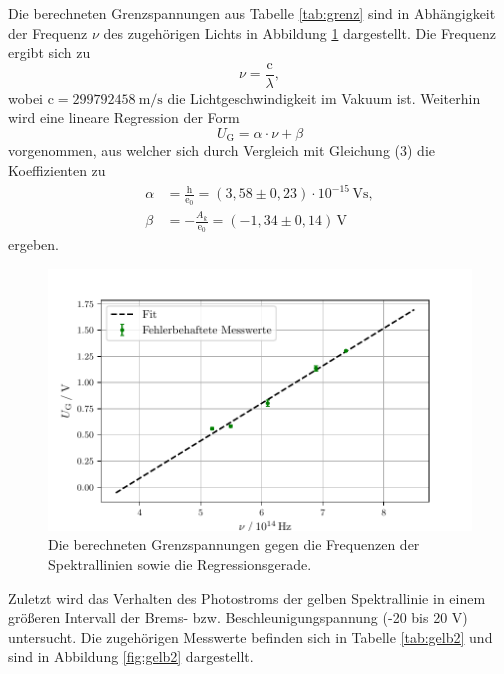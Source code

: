 Die berechneten Grenzspannungen aus Tabelle \ref{tab:grenz} sind in Abhängigkeit der Frequenz $\nu$
des zugehörigen Lichts in Abbildung \ref{fig:grenz} dargestellt. Die Frequenz ergibt sich zu
\begin{equation}
  \nu = \frac{\mathrm{c}}{\lambda},
\end{equation}
wobei $\mathrm{c} = \SI{299792458}{\meter\per\second}$ die Lichtgeschwindigkeit im Vakuum \cite{c} ist.
Weiterhin wird eine lineare Regression der Form
\begin{equation}
  U_\text{G} = \alpha\cdot\nu + \beta
\end{equation}
vorgenommen, aus welcher sich durch Vergleich mit Gleichung (3) die Koeffizienten zu
\begin{align*}
\alpha &= \frac{\mathrm{h}}{\mathrm{e_0}} = (3,58 \pm 0,23)\cdot 10^{-15}\,\si{\volt\second},\\
\beta &= - \frac{A_k}{\mathrm{e_0}} = (-1,34 \pm 0,14)\,\si{\volt}
\end{align*}
ergeben.

\begin{figure}[H]
  \centering
  \includegraphics{grenz.pdf}
  \caption{Die berechneten Grenzspannungen gegen die Frequenzen der Spektrallinien sowie die Regressionsgerade.}
  \label{fig:grenz}
\end{figure}

Zuletzt wird das Verhalten des Photostroms der gelben Spektrallinie in einem größeren Intervall der Brems- bzw. Beschleunigungspannung
(-20 bis 20 V) untersucht. Die zugehörigen Messwerte befinden sich in Tabelle \ref{tab:gelb2}
und sind in Abbildung \ref{fig:gelb2} dargestellt.

